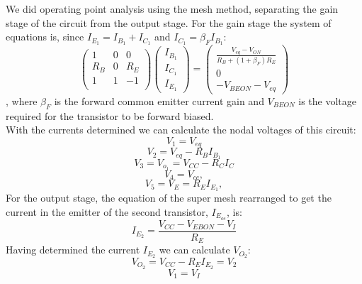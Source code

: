 We did operating point analysis using the mesh method, separating the gain stage of the circuit from the output stage. For the gain stage the system of equations is, since $I_{E_1}=I_{B_1}+I_{C_1}$ and $I_{C_1}=\beta_F I_{B_1}$:
\begin{equation}
\left(\begin{array}{ccc} 1 & 0 & 0 \\
R_B & 0 & R_E\\
1 & 1 & -1 \\
\end{array}\right)
\left(\begin{array}{c} I_{B_1} \\ I_{C_1} \\ I_{E_1}  \end{array}\right) 
= \left(\begin{array}{c} \frac{V_{eq}-V_{ON}}{R_B+(1+\beta_F)R_E}\\ 0 \\ -V_{BEON}-V_{eq}  \end{array}\right)
\end{equation},
where $\beta_F$ is the forward common emitter current gain and $V_{BEON}$ is the voltage required for the transistor to be forward biased. \\
With the currents determined we can calculate the nodal voltages of this circuit:
\begin{equation}
    V_1=V_{eq}
\end{equation}
\begin{equation}
    V_2=V_{eq}-R_B I_{B_1}
\end{equation}
\begin{equation}
    V_3=V_{o_{1}}=V_{CC}-R_C I_C
\end{equation}
\begin{equation}
    V_4=V_{cc},
\end{equation}
\begin{equation}
    V_5= V_E=R_E I_{E_1},
\end{equation}
For the output stage, the equation of the super mesh rearranged to get the current in the emitter of the second transistor, $I_{E_{os}}$,  is: 
\begin{equation}
I_{E_2}=\frac{V_{CC}-V_{EBON}-V_I}{R_E}
\end{equation}
Having determined the current $I_{E_2}$ we can calculate $V_{O_2}$:
\begin{equation}
V_{O_2}=V_{CC}-R_E I_{E_2}=V_2
\end{equation}
\begin{equation} 
V_1=V_I
\end{equation}
